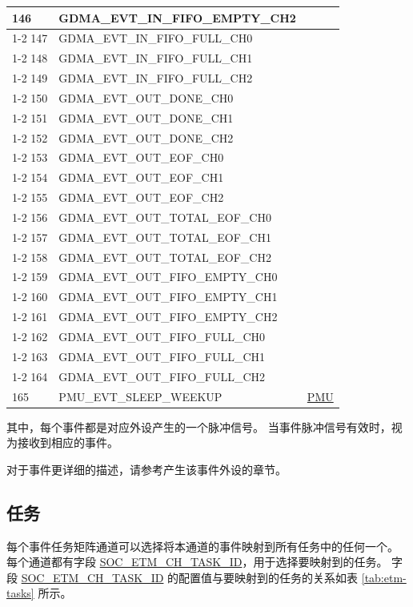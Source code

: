 \documentclass[main\_\_CN.tex]{subfiles}
\begin{document}
\begin{longtable}{ | l | l | l | }
146 & GDMA\_EVT\_IN\_FIFO\_EMPTY\_CH2  & \\ \cline{1-2}
147 & GDMA\_EVT\_IN\_FIFO\_FULL\_CH0   & \\ \cline{1-2}
148 & GDMA\_EVT\_IN\_FIFO\_FULL\_CH1   & \\ \cline{1-2}
149 & GDMA\_EVT\_IN\_FIFO\_FULL\_CH2   & \\ \cline{1-2}
150 & GDMA\_EVT\_OUT\_DONE\_CH0 & \\ \cline{1-2}
151 & GDMA\_EVT\_OUT\_DONE\_CH1 & \\ \cline{1-2}
152 & GDMA\_EVT\_OUT\_DONE\_CH2 & \\ \cline{1-2}
153 & GDMA\_EVT\_OUT\_EOF\_CH0  & \\ \cline{1-2}
154 & GDMA\_EVT\_OUT\_EOF\_CH1  & \\ \cline{1-2}
155 & GDMA\_EVT\_OUT\_EOF\_CH2  & \\ \cline{1-2}
156 & GDMA\_EVT\_OUT\_TOTAL\_EOF\_CH0  & \\ \cline{1-2}
157 & GDMA\_EVT\_OUT\_TOTAL\_EOF\_CH1  & \\ \cline{1-2}
158 & GDMA\_EVT\_OUT\_TOTAL\_EOF\_CH2  & \\ \cline{1-2}
159 & GDMA\_EVT\_OUT\_FIFO\_EMPTY\_CH0 & \\ \cline{1-2}
160 & GDMA\_EVT\_OUT\_FIFO\_EMPTY\_CH1 & \\ \cline{1-2}
161 & GDMA\_EVT\_OUT\_FIFO\_EMPTY\_CH2 & \\ \cline{1-2}
162 & GDMA\_EVT\_OUT\_FIFO\_FULL\_CH0  & \\ \cline{1-2}
163 & GDMA\_EVT\_OUT\_FIFO\_FULL\_CH1  & \\ \cline{1-2}
164 & GDMA\_EVT\_OUT\_FIFO\_FULL\_CH2  & \\ \hline
165 & PMU\_EVT\_SLEEP\_WEEKUP   & \hyperref[mod:lowpowm]{PMU} \\ \hline
\end{longtable}

其中，每个事件都是对应外设产生的一个脉冲信号。 当事件脉冲信号有效时，视为接收到相应的事件。

对于事件更详细的描述，请参考产生该事件外设的章节。

\subsection{任务}
\label{sec:evntaskmatrix-tasks}

每个事件任务矩阵通道可以选择将本通道的事件映射到所有任务中的任何一个。 每个通道都有字段 \hyperref[fielddesc:SOCETMCH0TASKID]{SOC\_ETM\_CH\_TASK\_ID}，用于选择要映射到的任务。 字段 \hyperref[fielddesc:SOCETMCH0TASKID]{SOC\_ETM\_CH\_TASK\_ID} 的配置值与要映射到的任务的关系如表 \ref{tab:etm-tasks} 所示。
\end{document}
